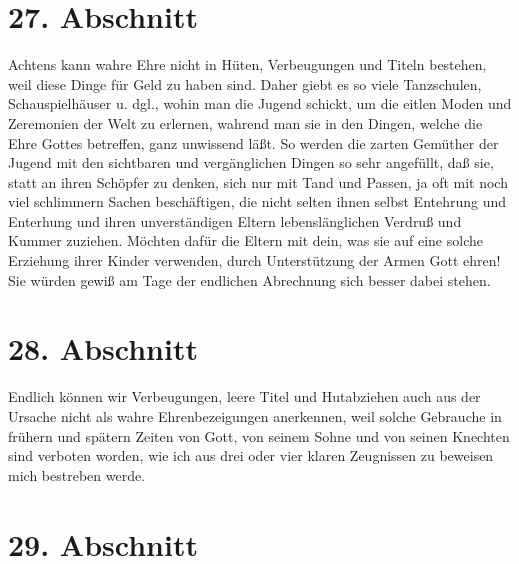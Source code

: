 \section{27. Abschnitt} \label{kap9_ab27}

Achtens kann wahre Ehre nicht in Hüten, Verbeugungen und Titeln bestehen, weil
diese Dinge für Geld zu haben sind. Daher giebt es so viele
Tanzschulen,
Schauspielhäuser u. dgl., wohin man die Jugend schickt, um die
eitlen Moden und
Zeremonien der Welt zu erlernen, wahrend man sie in den Dingen, welche die Ehre
Gottes betreffen, ganz unwissend läßt. So werden die zarten Gemüther der Jugend
mit den sichtbaren und vergänglichen Dingen so sehr angefüllt, daß sie, statt an
ihren Schöpfer zu denken, sich nur mit Tand und Passen, ja oft mit noch viel
schlimmern Sachen beschäftigen, die nicht selten ihnen selbst Entehrung und
Enterhung und ihren unverständigen Eltern lebenslänglichen Verdruß und Kummer
zuziehen. Möchten dafür die Eltern mit dein, was sie auf eine solche Erziehung
ihrer Kinder verwenden, durch Unterstützung der Armen Gott ehren! Sie würden
gewiß am Tage der endlichen Abrechnung sich besser dabei stehen.

\section{28. Abschnitt} \label{kap9_ab28}

Endlich können wir Verbeugungen, leere Titel und Hutabziehen auch aus der
Ursache nicht als wahre Ehrenbezeigungen anerkennen, weil solche Gebrauche in
frühern und spätern Zeiten von Gott, von seinem Sohne und von seinen Knechten
sind verboten worden, wie ich aus drei oder vier klaren Zeugnissen zu beweisen
mich bestreben werde.

\section{29. Abschnitt} \label{kap9_ab29}

